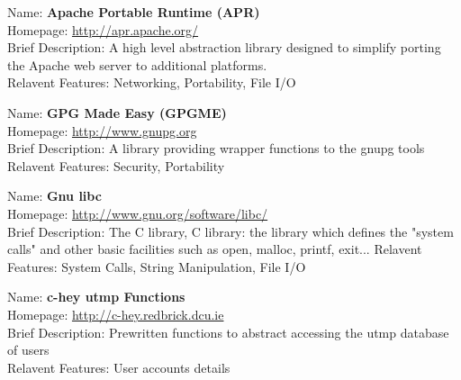 
Name: 	\textbf{Apache Portable Runtime (APR)} \\
Homepage: 	\url{http://apr.apache.org/}	\\	
Brief Description: 	A high level abstraction library designed to 
simplify porting the Apache web server to additional platforms. \\
Relavent Features: Networking, Portability, File I/O


Name:		\textbf{GPG Made Easy (GPGME)}	\\
Homepage:		\url{http://www.gnupg.org}	\\
Brief Description:		A library providing wrapper functions to the gnupg tools
Relavent Features: Security, Portability


Name:		\textbf{Gnu libc}	\\	
Homepage:		\url{http://www.gnu.org/software/libc/}	\\
Brief Description:		The C library, C library: the library which
defines the "system calls" and other basic facilities such as open,
malloc, printf, exit...
Relavent Features: System Calls, String Manipulation, File I/O


Name:		\textbf{c-hey utmp Functions}	\\	
Homepage:		\url{http://c-hey.redbrick.dcu.ie}	\\
Brief Description: Prewritten functions to abstract accessing the utmp
database of users \\
Relavent Features: User accounts details

